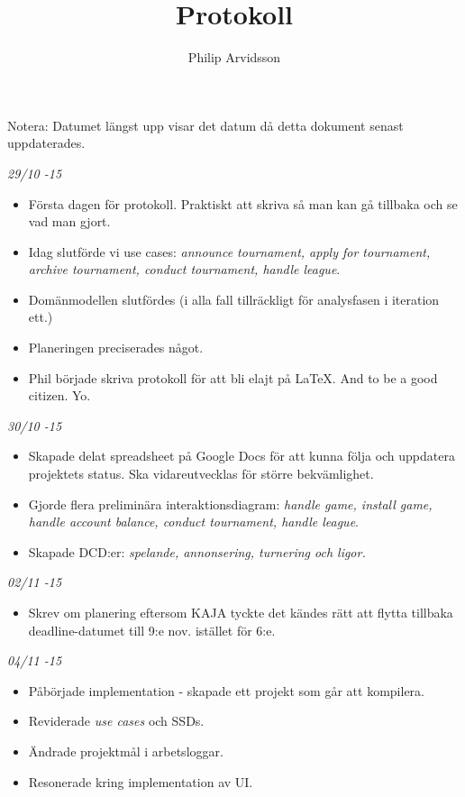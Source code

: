 \documentclass{article}
\title{Protokoll}
\author{Philip Arvidsson}
\begin{document}
    \maketitle

    Notera: Datumet längst upp visar det datum då detta dokument senast
            uppdaterades.

    \vspace{1.5cm}

    {\large \textit{29/10 -15}}
    \begin{itemize}
        \item Första dagen för protokoll. Praktiskt att skriva så man kan
              gå tillbaka och se vad man gjort.

        \item Idag slutförde vi use cases: \textit{announce tournament,
              apply for tournament, archive tournament, conduct
              tournament, handle league}.

        \item Domänmodellen slutfördes (i alla fall tillräckligt för
              analysfasen i iteration ett.)

        \item Planeringen preciserades något.

        \item Phil började skriva protokoll för att bli elajt på LaTeX.
              And to be a good citizen. Yo.
    \end{itemize}

    {\large \textit{30/10 -15}}
    \begin{itemize}
        \item Skapade delat spreadsheet på Google Docs för att kunna följa
              och uppdatera projektets status. Ska vidareutvecklas för
              större bekvämlighet.

        \item Gjorde flera preliminära interaktionsdiagram: \textit{handle game,
              install game, handle account balance, conduct tournament, handle
              league}.

        \item Skapade DCD:er: \textit{spelande, annonsering, turnering och
              ligor.}
    \end{itemize}

    {\large \textit{02/11 -15}}
    \begin{itemize}
        \item Skrev om planering eftersom KAJA tyckte det kändes rätt att flytta
              tillbaka deadline-datumet till 9:e nov. istället för 6:e.
    \end{itemize}

    {\large \textit{04/11 -15}}
    \begin{itemize}
        \item Påbörjade implementation - skapade ett projekt som går att
              kompilera.
        \item Reviderade \textit{use cases} och SSDs.
        \item Ändrade projektmål i arbetsloggar.
        \item Resonerade kring implementation av UI.
    \end{itemize}
\end{document}
